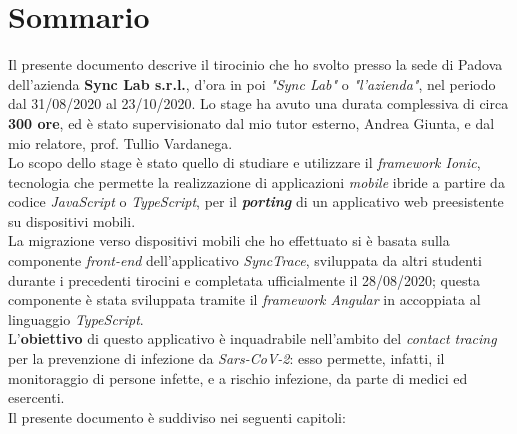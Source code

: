 
\cleardoublepage
{}
{}
\begingroup
\let\clearpage\relax
\let\cleardoublepage\relax
\let\cleardoublepage\relax

\chapter*{Sommario}

Il presente documento descrive il tirocinio che ho svolto presso la sede di Padova dell'azienda \textbf{Sync Lab s.r.l.}, d'ora in poi \textit{"Sync Lab"} o \textit{"l'azienda"}, nel periodo dal 31/08/2020 al 23/10/2020. Lo stage ha avuto una durata complessiva di circa \textbf{300 ore}, ed è stato supervisionato dal mio tutor esterno, Andrea Giunta, e dal mio relatore, prof. Tullio Vardanega.\\
Lo scopo dello stage è stato quello di studiare e utilizzare il \textit{framework Ionic}, tecnologia che permette la realizzazione di applicazioni \textit{mobile} ibride a partire da codice \textit{JavaScript} o \textit{TypeScript}, per il \textbf{\textit{porting}} di un applicativo web preesistente su dispositivi mobili. \\
La migrazione verso dispositivi mobili che ho effettuato si è basata sulla componente \textit{front-end} dell'applicativo \textit{SyncTrace}, sviluppata da altri studenti durante i precedenti tirocini e completata ufficialmente il 28/08/2020; questa componente è stata sviluppata tramite il \textit{framework Angular} in accoppiata al linguaggio \textit{TypeScript}. \\
L'\textbf{obiettivo} di questo applicativo è inquadrabile nell'ambito del \textit{contact tracing} per la prevenzione di infezione da \textit{Sars-CoV-2}: esso permette, infatti, il monitoraggio di persone infette, e a rischio infezione, da parte di medici ed esercenti.\\
Il presente documento è suddiviso nei seguenti capitoli:
